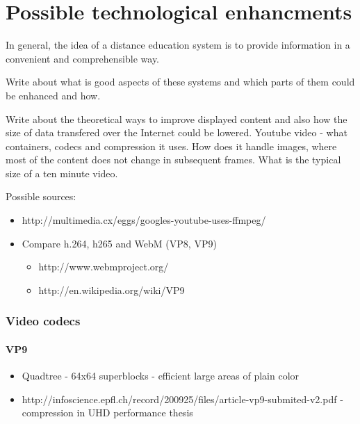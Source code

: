 \chapter{Possible technological enhancments}

In general, the idea of a distance education system is to provide information in a convenient and comprehensible way. 




Write about what is good aspects of these systems and which parts of them could be enhanced and how.

Write about the theoretical ways to improve displayed content and also how the size of data transfered over the Internet could be lowered. Youtube video - what containers, codecs and compression it uses. How does it handle images, where most of the content does not change in subsequent frames. What is the typical size of a ten minute video.

Possible sources:
\begin{itemize}
	\item http://multimedia.cx/eggs/googles-youtube-uses-ffmpeg/
	\item Compare h.264, h265 and WebM (VP8, VP9)
	\begin{itemize}
		\item http://www.webmproject.org/
		\item http://en.wikipedia.org/wiki/VP9
	\end{itemize}
\end{itemize}

\subsection{Video codecs}
\subsubsection{VP9}
\begin{itemize}
	\item Quadtree - 64x64 superblocks - efficient large areas of plain color
	\item http://infoscience.epfl.ch/record/200925/files/article-vp9-submited-v2.pdf - compression in UHD performance thesis
\end{itemize}